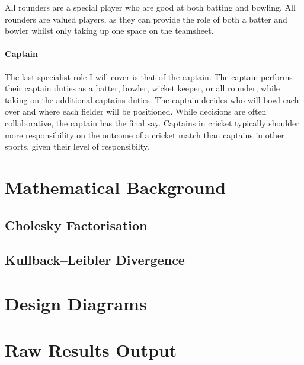 \documentclass[12pt,a4paper]{report}
\theoremstyle{definition}
\begin{document}
All rounders are a special player who are good at both batting and bowling.
All rounders are valued players, as they can provide the role of both a batter and bowler whilst only taking up one space on the teamsheet.

\subsubsection{Captain}

The last specialist role I will cover is that of the captain. 
The captain performs their captain duties as a batter, bowler, wicket keeper, or all rounder, while taking on the additional captains duties.
The captain decides who will bowl each over and where each fielder will be positioned. 
While decisions are often collaborative, the captain has the final say.
Captains in cricket typically shoulder more responsibility on the outcome of a cricket match than captains in other sports, given their level of responsibilty.

\chapter{Mathematical Background}

\section{Cholesky Factorisation} \label{sec:CholFac}

\section{Kullback–Leibler Divergence} \label{sec:KLDiv}

\chapter{Design Diagrams}

\chapter{Raw Results Output}
\end{document}
